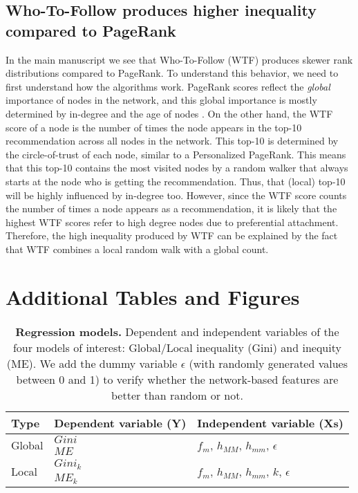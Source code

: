 \documentclass[fleqn,10pt]{wlscirep}
\begin{document}
\subsection{Who-To-Follow produces higher inequality compared to PageRank}
\label{sm:pr_wtf}
In the main manuscript we see that Who-To-Follow (WTF) produces skewer rank distributions compared to PageRank.
To understand this behavior, we need to first understand how the algorithms work.
PageRank scores reflect the \textit{global} importance of nodes in the network, and this global importance is mostly determined by in-degree \cite{fortunato2006approximating} and the age of nodes \cite{mariani2015ranking}.
On the other hand, the WTF score of a node is the number of times the node appears in the top-10 recommendation across all nodes in the network. 
This top-10 is determined by the circle-of-trust of each node, similar to a Personalized PageRank.
This means that this top-10 contains the most visited nodes by a random walker that always starts at the node who is getting the recommendation. Thus, that (local) top-10 will be highly influenced by in-degree too.
However, since the WTF score counts the number of times a node appears as a recommendation, it is likely that the highest WTF scores refer to high degree nodes due to preferential attachment.
Therefore, the high inequality produced by WTF can be explained by the fact that WTF combines a local random walk with a global count.


\section{Additional Tables and Figures}




\begin{table}[h!]
\centering
\caption{\textbf{Regression models.} Dependent and independent variables of the four models of interest: Global/Local inequality (Gini) and inequity (ME). We add the dummy variable $\epsilon$ (with randomly generated values between 0 and 1) to verify whether the network-based features are better than random or not.}
\label{tbl:models}
\begin{tabular}{@{}lll@{}}
\toprule
\textbf{Type} & \textbf{Dependent variable (Y)} & \textbf{Independent variable (Xs)} \\ \midrule
\multirow{2}{*}{Global} & $Gini$   & \multirow{2}{*}{$f_m$, $h_{MM}$, $h_{mm}$, $\epsilon$}    \\
                        & $ME$     &                                               \\
\multirow{2}{*}{Local}  & $Gini_k$ & \multirow{2}{*}{$f_m$, $h_{MM}$, $h_{mm}$, $k$, $\epsilon$} \\
                        & $ME_k$   & \\ \bottomrule
\end{tabular}
\end{table}
\end{document}

